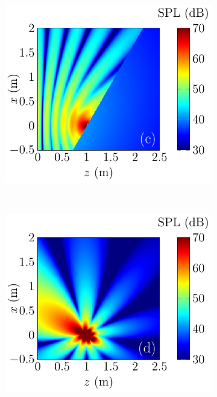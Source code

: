\begin{figure}[!htb]
\begin{subfigure}{0.32\textwidth}
    \end{subfigure}
    \begin{subfigure}{0.32\textwidth}
        \centering
        \includegraphics[width = \textwidth]{fig/ComputeCircPistonReflection_1000Hz_Total_211013F.pdf}
    \end{subfigure}
        \\
    \begin{subfigure}{0.32\textwidth}
        \centering
        \includegraphics[width = \textwidth]{fig/ComputeEndfireReflection_1000Hz_Incident_211013G.pdf}

\end{subfigure}
\end{figure}
